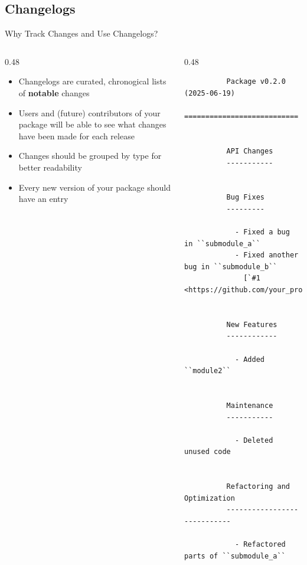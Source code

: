 \subsection{Changelogs}
\begin{frame}[fragile]{Why Track Changes and Use Changelogs?}
  \begin{columns}[t, onlytextwidth]
    \begin{column}{0.48\textwidth}
       \begin{itemize}
          \setlength{\itemsep}{1.5em}
          \item Changelogs are curated, chronogical lists of \textbf{notable} changes
          \item Users and (future) contributors of your package will be able to see
            what changes have been made for each release
          \item Changes should be grouped by type for better readability
          \item Every new version of your package should have an entry
        \end{itemize}
     \end{column}
     \hfill
     \begin{column}{0.48\textwidth}
       \scriptsize
       \begin{verbatim}
          Package v0.2.0 (2025-06-19)
          ===========================


          API Changes
          -----------


          Bug Fixes
          ---------

            - Fixed a bug in ``submodule_a``
            - Fixed another bug in ``submodule_b``
              [`#1 <https://github.com/your_project/package/pull/1>`__]


          New Features
          ------------

            - Added ``module2``


          Maintenance
          -----------

            - Deleted unused code

 
          Refactoring and Optimization
          ----------------------------

            - Refactored parts of ``submodule_a``

       \end{verbatim}
     \end{column}
  \end{columns}
  \end{frame}

